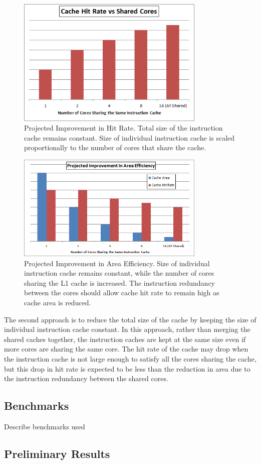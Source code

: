 \begin{figure}[t]
\centering
\includegraphics[width=90mm]{HitRateImprov.png}
\caption{Projected Improvement in Hit Rate. Total size of the instruction cache remains constant. Size of individual instruction cache is scaled proportionally to the number of cores that share the cache.}
\label{HitImprov}
\end{figure}


\begin{figure}[b!]
\centering
\includegraphics[width=90mm]{AreaEff.png}
\caption{Projected Improvement in Area Efficiency. Size of individual instruction cache remains constant, while the number of cores sharing the L1 cache is increased. The instruction redundancy between the cores should allow cache hit rate to remain high as cache area is reduced. }
\label{AreaEff}
\end{figure}


The second approach is to reduce the total size of the cache by keeping the size of individual instruction cache constant. In this approach, rather than merging the shared caches together, the instruction caches are kept at the same size even if more cores are sharing the same core. The hit rate of the cache may drop when the instruction cache is not large enough to satisfy all the cores sharing the cache, but this drop in hit rate is expected to be less than the reduction in area due to the instruction redundancy between the shared cores.


\subsection{Benchmarks}
Describe benchmarks used 

\subsection{Preliminary Results}


